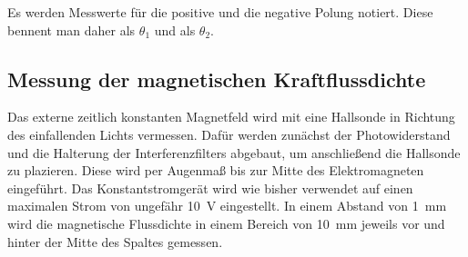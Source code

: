 Es werden Messwerte für die positive und die negative Polung notiert. Diese bennent man daher als $\theta_1$ und als $\theta_2$.

\subsection{Messung der magnetischen Kraftflussdichte}
\label{sec:Kraftflussdichte}

Das externe zeitlich konstanten Magnetfeld wird mit eine Hallsonde in Richtung des einfallenden Lichts vermessen.
Dafür werden zunächst der Photowiderstand und die Halterung der Interferenzfilters abgebaut, um anschließend
die Hallsonde zu plazieren. Diese wird per Augenmaß bis zur Mitte des Elektromagneten eingeführt. Das Konstantstromgerät
wird wie bisher verwendet auf einen maximalen Strom von ungefähr \qty{10}{\volt} eingestellt. In einem Abstand von 
\qty{1}{\milli\meter} wird die magnetische Flussdichte in einem Bereich von \qty{10}{\milli\meter} jeweils vor und hinter
der Mitte des Spaltes gemessen.
